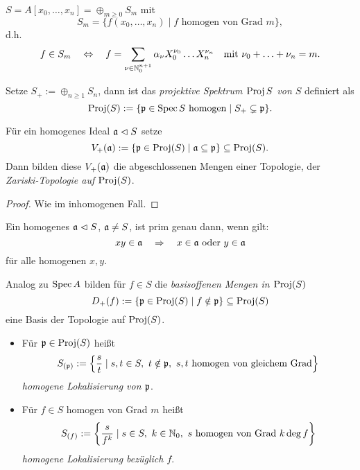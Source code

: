 \begin{beispiel}
	$S = A[x_0,\ldots,x_n] = \oplus_{m\geq 0} S_m$ mit
	\[
		S_m = \{f(x_0,\ldots,x_n) \mid f\text{ homogen von Grad $m$}\},
	\]
	d.h. 
	\[
		f\in S_m \quad\Leftrightarrow\quad
			f = \sum_{\nu \in \mathbb{N}_0^{n+1}} \alpha_\nu X_0^{\nu_0} 
				\ldots X_n^{\nu_n} \quad\text{mit }
				\nu_0 + \ldots+\nu_n = m.
	\]
\end{beispiel}


\begin{definition}[$\Proj(S)$]
	Setze $S_+ := \oplus_{n\geq 1} S_n$, dann ist das
	\emph{projektive Spektrum $\operatorname{Proj} S$ von $S$} definiert als
	\[
		\operatorname{Proj}(S) := \{ \mathfrak{p} \in \operatorname{Spec} S\text{ homogen} \mid
			S_+ \subsetneq \mathfrak{p}\}.
	\]
\end{definition}

\begin{definition}
	Für ein homogenes Ideal $\mathfrak{a} \vartriangleleft S$ setze
	\[
		V_+(\mathfrak{a}) := \{ \mathfrak{p} \in \operatorname{Proj}(S)\mid \mathfrak{a}\subseteq \mathfrak{p}\} \subseteq 
			\operatorname{Proj}(S).
	\]
	Dann bilden diese $V_+(\mathfrak{a})$ die abgeschlossenen Mengen einer Topologie,
	der \emph{Zariski-Topologie auf $\Proj(S)$}.
\end{definition}
\begin{proof}
	Wie im inhomogenen Fall.
\end{proof}

\begin{bemerkung}
	Ein homogenes $\mathfrak{a} \vartriangleleft S$, $\mathfrak{a}\neq S$, ist prim genau dann, wenn
	gilt:
	\[ xy \in \mathfrak{a} \quad \Rightarrow\quad x\in\mathfrak{a} \text{ oder } y\in\mathfrak{a}\]
	für alle homogenen $x,y$.
\end{bemerkung}

\begin{definition}
	Analog zu $\operatorname{Spec} A$ bilden für $f\in S$ 
	die \emph{basisoffenen Mengen in $\Proj(S)$}
	\[
		D_+(f) := \{ \mathfrak{p} \in \operatorname{Proj}(S) \mid f\notin \mathfrak{p}\}\subseteq \operatorname{Proj}(S)
	\]
	eine Basis der Topologie auf $\Proj(S)$.
\end{definition}

\begin{definition}
	\begin{itemize}
	  \item Für $\mathfrak{p}\in \operatorname{Proj}(S)$ heißt
		  \[
		  	S_{(\p)} := \left\{ \frac s t \mid s,t \in S,\ t\notin \p,\ 
		  		s,t \text{ homogen von gleichem Grad}\right\}
		  \]
		  \emph{homogene Lokalisierung von $\mathfrak{p}$}.
	  \item Für $f \in S $ homogen von Grad $m$ heißt
	  	\[ 
	  		S_{(f)} := \left\{ \frac{s}{f^k} \mid s\in S,\ k\in \N_0,\ 
	  			s\text{ homogen von Grad } k\deg f\right\}
	  	\]
	  	\emph{homogene Lokalisierung bezüglich $f$}.	  	
	\end{itemize}
\end{definition}


